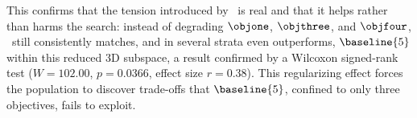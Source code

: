 This confirms that the tension introduced by \objtwo\ is real and that it helps rather than harms the search: instead of degrading $\objone$, $\objthree$, and $\objfour$, \methodNameUniform\ still consistently matches, and in several strata even outperforms, $\baseline{5}$ within this reduced 3D subspace, a result confirmed by a Wilcoxon signed-rank test ($W = 102.00$, $p = 0.0366$, effect size $r = 0.38$). This regularizing effect forces the population to discover trade-offs that $\baseline{5}$, confined to only three objectives, fails to exploit.






